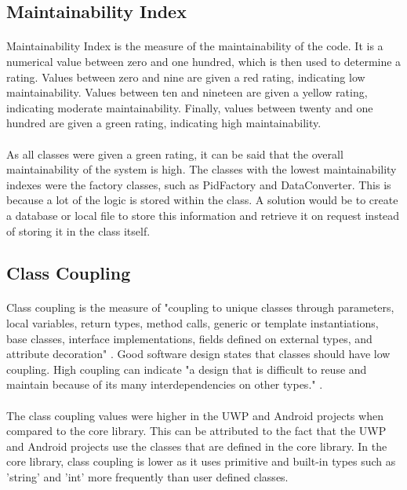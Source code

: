 {	\subsection*{Maintainability Index}
		\paragraph{}{
		Maintainability Index is the measure of the maintainability of the code. It is a numerical value between zero and one hundred, which is then used to determine a rating. Values between zero and nine are given a red rating, indicating low maintainability. Values between ten and nineteen are given a yellow rating, indicating moderate maintainability. Finally, values between twenty and one hundred are given a green rating, indicating high maintainability.
		}
		\paragraph{}{
		As all classes were given a green rating, it can be said that the overall maintainability of the system is high. The classes with the lowest maintainability indexes were the factory classes, such as PidFactory and DataConverter. This is because a lot of the logic is stored within the class. A solution would be to create a database or local file to store this information and retrieve it on request instead of storing it in the class itself.
		}
	
	\subsection*{Class Coupling}
		\paragraph{}{
		Class coupling is the measure of "coupling to unique classes through parameters, local variables, return types, method calls, generic or template instantiations, base classes, interface implementations, fields defined on external types, and attribute decoration" \cite{CodeMetrics}. Good software design states that classes should have low coupling. High coupling can indicate "a design that is difficult to reuse and maintain because of its many interdependencies on other types." \cite{CodeMetrics}.
		}
		\paragraph{}{
		The class coupling values were higher in the UWP and Android projects when compared to the core library. This can be attributed to the fact that the UWP and Android projects use the classes that are defined in the core library. In the core library, class coupling is lower as it uses primitive and built-in types such as 'string' and 'int' more frequently than user defined classes.
		}
	
}

